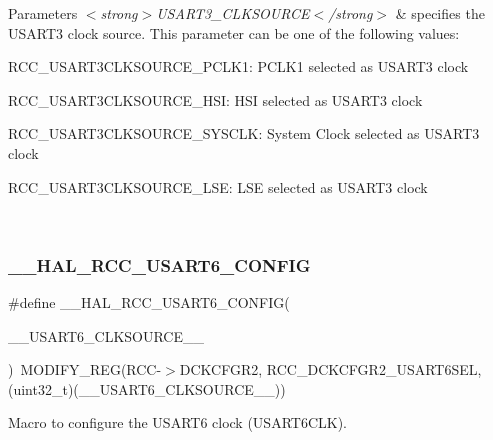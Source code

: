 \begin{DoxyParams}{Parameters}
{\em $<$strong$>$\+U\+S\+A\+R\+T3\+\_\+\+C\+L\+K\+S\+O\+U\+R\+C\+E$<$/strong$>$} & specifies the U\+S\+A\+R\+T3 clock source. This parameter can be one of the following values\+: \begin{DoxyItemize}
\item R\+C\+C\+\_\+\+U\+S\+A\+R\+T3\+C\+L\+K\+S\+O\+U\+R\+C\+E\+\_\+\+P\+C\+L\+K1\+: P\+C\+L\+K1 selected as U\+S\+A\+R\+T3 clock \item R\+C\+C\+\_\+\+U\+S\+A\+R\+T3\+C\+L\+K\+S\+O\+U\+R\+C\+E\+\_\+\+H\+SI\+: H\+SI selected as U\+S\+A\+R\+T3 clock \item R\+C\+C\+\_\+\+U\+S\+A\+R\+T3\+C\+L\+K\+S\+O\+U\+R\+C\+E\+\_\+\+S\+Y\+S\+C\+LK\+: System Clock selected as U\+S\+A\+R\+T3 clock \item R\+C\+C\+\_\+\+U\+S\+A\+R\+T3\+C\+L\+K\+S\+O\+U\+R\+C\+E\+\_\+\+L\+SE\+: L\+SE selected as U\+S\+A\+R\+T3 clock \end{DoxyItemize}
\\
\hline
\end{DoxyParams}
\mbox{\label{group___r_c_c_ex___exported___macros_ga43e1d7400af3a191b3fc89d461799f3d}} 
\subsubsection{\texorpdfstring{\_\_HAL\_RCC\_USART6\_CONFIG}{\_\_HAL\_RCC\_USART6\_CONFIG}}
{\footnotesize\ttfamily \#define \+\_\+\+\_\+\+H\+A\+L\+\_\+\+R\+C\+C\+\_\+\+U\+S\+A\+R\+T6\+\_\+\+C\+O\+N\+F\+IG(\begin{DoxyParamCaption}\item[{}]{\+\_\+\+\_\+\+U\+S\+A\+R\+T6\+\_\+\+C\+L\+K\+S\+O\+U\+R\+C\+E\+\_\+\+\_\+ }\end{DoxyParamCaption})~M\+O\+D\+I\+F\+Y\+\_\+\+R\+EG(R\+CC-\/$>$D\+C\+K\+C\+F\+G\+R2, R\+C\+C\+\_\+\+D\+C\+K\+C\+F\+G\+R2\+\_\+\+U\+S\+A\+R\+T6\+S\+EL, (uint32\+\_\+t)(\+\_\+\+\_\+\+U\+S\+A\+R\+T6\+\_\+\+C\+L\+K\+S\+O\+U\+R\+C\+E\+\_\+\+\_\+))}



Macro to configure the U\+S\+A\+R\+T6 clock (U\+S\+A\+R\+T6\+C\+LK). 


